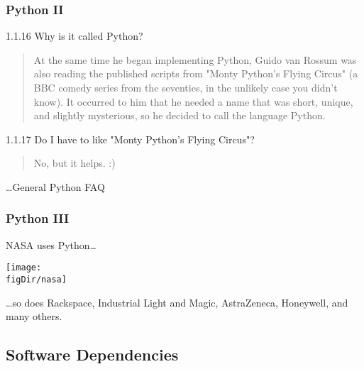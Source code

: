 \documentclass[10pt,t]{beamer}
\def\figDir{figures}
\begin{document}
\begin{frame}
  \frametitle{Python II}
  1.1.16   Why is it called Python?
  \begin{quotation}
    At the same time he began implementing Python, Guido van Rossum was also
    reading the published scripts from "Monty Python's Flying Circus" (a BBC
    comedy series from the seventies, in the unlikely case you didn't know). It
    occurred to him that he needed a name that was short, unique, and slightly
    mysterious, so he decided to call the language Python.
  \end{quotation}

  1.1.17   Do I have to like "Monty Python's Flying Circus"?
  \begin{quotation}
    No, but it helps. :)
  \end{quotation}

  \hfill \dots General Python FAQ
  
\end{frame}


\begin{frame}
  \frametitle{Python III}

  NASA uses Python\dots
  \begin{center}
    \texttt{[image: \\figDir/nasa]}
  \end{center}
  \dots so does Rackspace, Industrial Light and Magic, AstraZeneca, Honeywell,
  and many others.
  \vspace*{10mm}
  \begin{center}
  \end{center}
\end{frame}




\subsection{Software Dependencies}
\end{document}
